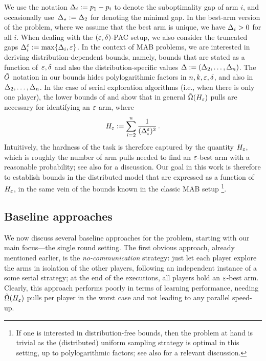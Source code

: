 \documentclass{article} %
\newcommand{\Dele}{\Del^{\eps}}
\newcommand{\Delst}{\Del_{\st}}
\begin{document}
We use the notation $\Delta_i := p_1 - p_i$ to denote the suboptimality gap of arm $i$, and occasionally use~$\Delst := \Del_2$ for denoting the minimal gap. In the best-arm version of the problem, where we assume that the best arm is unique, we have $\Delta_i > 0$ for all $i$.
When dealing with the $(\varepsilon,\delta)$-PAC setup, we also consider the truncated gaps $\Dele_i := \max\{\Del_i,\eps\}$.
In the context of MAB problems, we are interested in deriving distribution-dependent bounds, namely, bounds that are stated as a function of~$\varepsilon,\delta$ and also the distribution-specific values  $\Delta := (\Delta_2,\ldots,\Delta_n)$.
The $\tilde{O}$ notation in our bounds hides polylogarithmic factors in $n,k,\varepsilon,\delta$, and also in~$\Delta_2,\ldots,\Delta_n$.
In the case of serial exploration algorithms (i.e., when there is only one player), the lower bounds of \citet{mannor04} and \citet{audibert10} show that in general $\tilde{\Omega}(H_\varepsilon)$ pulls are necessary for identifying an $\varepsilon$-arm, where
\begin{align} \label{eq:H}
	H_\eps :=
	\sum_{i=2}^{n} \frac{1}{(\Dele_i)^2} \,.
\end{align}
Intuitively, the hardness of the task is therefore captured by the quantity $H_\varepsilon$, which is roughly the number of arm pulls needed to find an $\varepsilon$-best arm with a reasonable probability; see also \cite{audibert10} for a discussion.
Our goal in this work is therefore to establish bounds in the distributed model that are expressed as a function of $H_\varepsilon$, in the same vein of the bounds known in the classic MAB setup%
\footnote{If one is interested in distribution-free bounds, then the problem at hand is trivial as the (distributed) uniform sampling strategy is optimal in this setting, up to polylogarithmic factors; see also \cite{mannor04} for a relevant discussion.}. 






\subsection{Baseline approaches}

We now discuss several baseline approaches for the problem, starting with our main focus---the single round setting.
The first obvious approach, already mentioned earlier, is the \emph{no-communication} strategy: just let each player explore the arms in isolation of the other players, following an independent instance of a some serial strategy; at the end of the executions, all players hold an $\varepsilon$-best arm.
Clearly, this approach performs poorly in terms of learning performance, needing $\tilde{\Omega}(H_\varepsilon)$ pulls per player in the worst case and not leading to any parallel speed-up.
\end{document}

